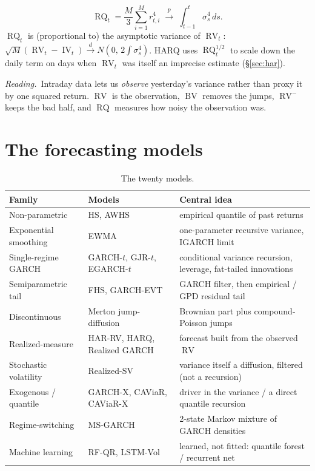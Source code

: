 \documentclass[11pt,a4paper]{article}
\newcommand{\RV}{\operatorname{RV}}
\newcommand{\BV}{\operatorname{BV}}
\newcommand{\RQ}{\operatorname{RQ}}
\newcommand{\IV}{\operatorname{IV}}
\newcommand{\dto}{\xrightarrow{d}}
\newcommand{\pto}{\xrightarrow{p}}
\newcommand{\intuition}[1]{\par\smallskip\noindent\textit{Reading.}\ #1\par\smallskip}
\begin{document}
\begin{equation}
  \RQ_t = \frac{M}{3}\sum_{i=1}^{M} r_{t,i}^4 \;\pto\; \int_{t-1}^{t}\sigma_s^4\,ds .
\end{equation}
$\RQ_t$ is (proportional to) the asymptotic variance of $\RV_t$:
$\sqrt{M}(\RV_t - \IV_t)\dto N(0,\,2\int\sigma_s^4)$. HARQ uses $\RQ_t^{1/2}$ to
scale down the daily term on days when $\RV_t$ was itself an imprecise estimate
(\S\ref{sec:har}).

\intuition{Intraday data lets us \emph{observe} yesterday's variance rather than
proxy it by one squared return. $\RV$ is the observation, $\BV$ removes the
jumps, $\RV^{-}$ keeps the bad half, and $\RQ$ measures how noisy the
observation was.}

\section{The forecasting models}\label{sec:models}

\begin{table}[t]
\centering\small
\begin{tabular}{@{}p{3.1cm}p{4.5cm}p{6.3cm}@{}}
\toprule
Family & Models & Central idea \\
\midrule
Non-parametric        & HS, AWHS                       & empirical quantile of past returns \\
Exponential smoothing & EWMA                           & one-parameter recursive variance, IGARCH limit \\
Single-regime GARCH   & GARCH-$t$, GJR-$t$, EGARCH-$t$ & conditional variance recursion, leverage, fat-tailed innovations \\
Semiparametric tail   & FHS, GARCH-EVT                 & GARCH filter, then empirical / GPD residual tail \\
Discontinuous         & Merton jump-diffusion          & Brownian part plus compound-Poisson jumps \\
Realized-measure      & HAR-RV, HARQ, Realized GARCH   & forecast built from the observed $\RV$ \\
Stochastic volatility & Realized-SV                    & variance itself a diffusion, filtered (not a recursion) \\
Exogenous / quantile  & GARCH-X, CAViaR, CAViaR-X      & driver in the variance / a direct quantile recursion \\
Regime-switching      & MS-GARCH                       & 2-state Markov mixture of GARCH densities \\
Machine learning      & RF-QR, LSTM-Vol                & learned, not fitted: quantile forest / recurrent net \\
\bottomrule
\end{tabular}
\caption{The twenty models.}\label{tab:models}
\end{table}
\end{document}
